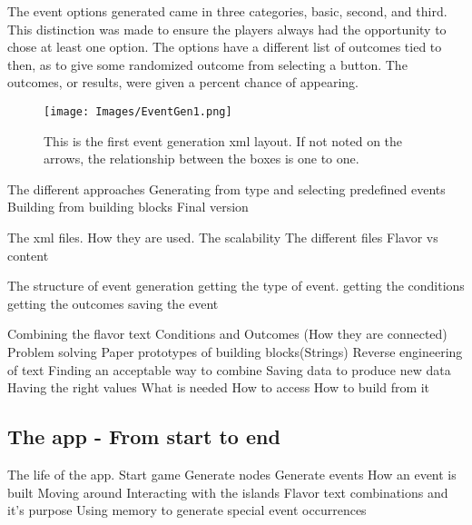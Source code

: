 The event options generated came in three categories, basic, second, and third. This distinction was made to ensure the players always had the opportunity to chose at least one option. 
The options have a different list of outcomes tied to then, as to give some randomized outcome from selecting a button.
The outcomes, or results, were given a percent chance of appearing. 

\begin{figure}[h]
    \centering
    \texttt{[image: Images/EventGen1.png]}
    \caption{This is the first event generation xml layout. If not noted on the arrows, the relationship between the boxes is one to one.}
    \label{fig:eGen1}
\end{figure}

The different approaches
Generating from type and selecting predefined events
Building from building blocks
Final version

The xml files.
How they are used. The scalability 
The different files
Flavor vs content

The structure of event generation
getting the type of event.
getting the conditions
getting the outcomes
saving the event


Combining the flavor text
Conditions and Outcomes (How they are connected)
Problem solving
Paper prototypes of building blocks(Strings)
Reverse engineering of text
Finding an acceptable way to combine
Saving data to produce new data
Having the right values
What is needed
How to access
How to build from it
\subsection{The app - From start to end}
The life of the app. 
Start game 
Generate nodes
Generate events
How an event is built
Moving around
Interacting with the islands
Flavor text combinations and it's purpose
Using memory to generate special event occurrences
